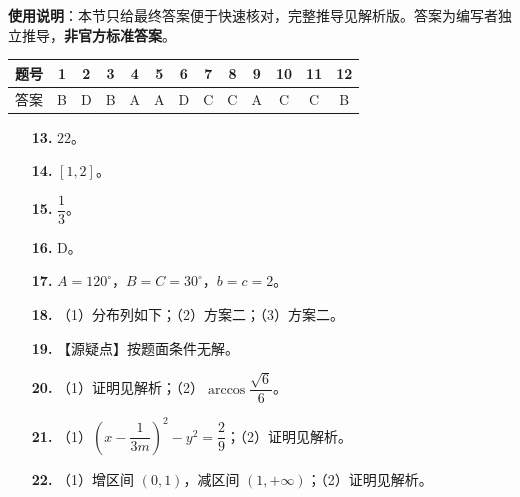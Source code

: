 
\begin{gknotice}
\textbf{使用说明}：本节只给最终答案便于快速核对，完整推导见解析版。答案为编写者独立推导，\textbf{非官方标准答案}。
\end{gknotice}

\begin{center}\begin{tabular}{ccccccccccccc}
\toprule
题号 & 1 & 2 & 3 & 4 & 5 & 6 & 7 & 8 & 9 & 10 & 11 & 12 \\
\midrule
答案 & B & D & B & A & A & D & C & C & A & C & C & B \\
\bottomrule
\end{tabular}\end{center}

\begin{itemize}[leftmargin=2.6em]
  \item[\textbf{13.}] $22$。
  \item[\textbf{14.}] $[1,2]$。
  \item[\textbf{15.}] $\dfrac13$。
  \item[\textbf{16.}] D。
\end{itemize}

\begin{itemize}[leftmargin=2.6em]
  \item[\textbf{17.}] $A=120^\circ$，$B=C=30^\circ$，$b=c=2$。
  \item[\textbf{18.}] （1）分布列如下；（2）方案二；（3）方案二。
  \item[\textbf{19.}] 【源疑点】按题面条件无解。
  \item[\textbf{20.}] （1）证明见解析；（2）$\arccos\dfrac{\sqrt6}6$。
  \item[\textbf{21.}] （1）$\left(x-\dfrac1{3m}\right)^2-y^2=\dfrac29$；（2）证明见解析。
  \item[\textbf{22.}] （1）增区间 $(0,1)$，减区间 $(1,+\infty)$；（2）证明见解析。
\end{itemize}
